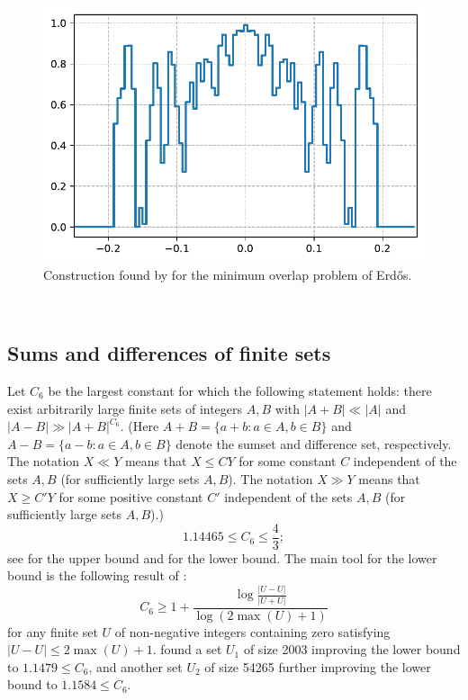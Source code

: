 \begin{figure}
    \centering
    \includegraphics[scale=0.5]{figures/erdos_min_overlap.pdf}
    \caption{Construction found by \method for the minimum overlap problem of Erd\H{o}s.}
    \label{fig:erdos}
\end{figure}


~

\subsection{Sums and differences of finite sets}
Let $C_6$ be the largest constant for which the following statement holds: there exist arbitrarily large finite sets of integers $A,B$ with $|A+B| \ll |A|$ and $|A-B| \gg |A+B|^{C_6}$.
(Here $A+B = \{a+b : a \in A, b \in B\}$ and $A-B = \{a-b : a \in A, b \in B\}$ denote the sumset and difference set, respectively. The notation $X \ll Y$ means that $X \le C Y$ for some constant $C$ independent of the sets $A,B$ (for sufficiently large sets $A,B$). The notation $X \gg Y$ means that $X \ge C' Y$ for some positive constant $C'$ independent of the sets $A,B$ (for sufficiently large sets $A,B$).)
\begin{equation}\label{cds}
 1.14465 \leq C_6 \leq \frac{4}{3};
\end{equation}
see \cite[Corollary 3]{gyarmati2007sums} for the 
upper bound and \cite[Theorem 1]{gyarmati2007sums} for the lower bound. The main tool for the lower bound is the following result of \citet{gyarmati2007sums}:
\begin{equation}\label{cds-lower}
 C_6 \geq 1 + \frac{\log \frac{|U-U|}{|U+U|}}{\log (2 \max (U) + 1)}
\end{equation}
for any finite set $U$ of non-negative integers containing zero satisfying $|U-U| \leq 2 \max (U) + 1$.
\method found a set $U_1$ of size 2003 improving the lower bound to $1.1479 \leq C_6$,
and another set $U_2$ of size 54265 further improving the lower bound  to 
$1.1584 \leq C_6$.

